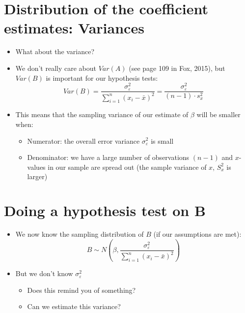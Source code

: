 \documentclass[]{article}
\providecommand{\tightlist}{%
  \setlength{\itemsep}{0pt}\setlength{\parskip}{0pt}}
\begin{document}
\section{Distribution of the coefficient estimates:
Variances}\label{distribution-of-the-coefficient-estimates-variances}

\begin{itemize}
\tightlist
\item
  What about the variance?
\item
  We don't really care about \(Var(A)\) (see page 109 in Fox, 2015), but
  \(Var(B)\) is important for our hypothesis tests:
  \[Var(B) = \frac{\sigma_{\varepsilon}^2}{\sum\limits_{i=1}^{n}(x_i-\bar{x})^2} = \frac{\sigma_{\varepsilon}^2}{(n-1)\cdot s^2_{x}}\]
\item
  This means that the sampling variance of our estimate of \(\beta\)
  will be smaller when:

  \begin{itemize}
  \tightlist
  \item
    Numerator: the overall error variance \(\sigma_{\varepsilon}^2\) is
    small
  \item
    Denominator: we have a large number of observations \((n-1)\) and
    \(x\)-values in our sample are spread out (the sample variance of
    \(x\), \(S_x^2\) is larger)
  \end{itemize}
\end{itemize}

\section{Doing a hypothesis test on
B}\label{doing-a-hypothesis-test-on-b}

\begin{itemize}
\tightlist
\item
  We now know the sampling distribution of \(B\) (if our assumptions are
  met):
  \[ B \sim N\left(\beta, \frac{\sigma_{\varepsilon}^2}{\sum\limits_{i=1}^{n}(x_i-\bar{x})^2}\right)\]
\item
  But we don't know \(\sigma_{\varepsilon}^2\)

  \begin{itemize}
  \tightlist
  \item
    Does this remind you of something?
  \item
    Can we estimate this variance?
  \end{itemize}
\end{itemize}
\end{document}
